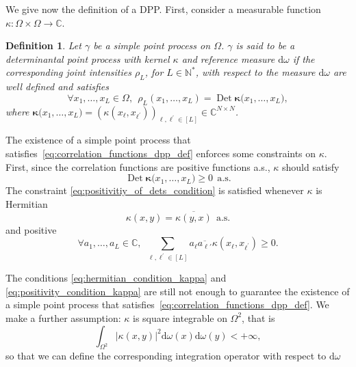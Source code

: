 \documentclass[twoside,11pt]{book}
\newtheorem{definition}{Definition}
\numberwithin{theorem}{chapter}
\numberwithin{definition}{chapter}
\numberwithin{proposition}{chapter}
\numberwithin{corollary}{chapter}
\numberwithin{example}{chapter}
\numberwithin{lemma}{chapter}
\DeclareMathOperator{\Det}{Det}
\begin{document}
We give now the definition of a DPP. First, consider a measurable function $\kappa: \Omega \times \Omega \rightarrow \mathbb{C}$.
\begin{definition}
Let $\gamma$ be a simple point process on $\Omega$. $\gamma$ is said to be a determinantal point process with kernel $\kappa$ and reference measure $\mathrm{d}\omega$ if the corresponding joint intensities $\rho_L$, for $L \in \mathbb{N}^{*}$, with respect to the measure $\mathrm{d}\omega$ are well defined and satisfies
\begin{equation}\label{eq:correlation_functions_dpp_def}
\forall x_{1}, \dots, x_{L} \in \Omega, \:\: \rho_{L}(x_{1}, \dots, x_{L}) = \Det \bm{\kappa}\big( x_{1}, \dots, x_{L} \big),
\end{equation}
where $\bm{\kappa}\big( x_{1}, \dots, x_{L} \big) = (\kappa(x_{\ell},x_{\ell^{'}}))_{\ell,\ell^{'} \in [L]} \in \mathbb{C}^{N \times N}$.

\end{definition}

The existence of a simple point process that satisfies~\eqref{eq:correlation_functions_dpp_def} enforces some constraints on $\kappa$. First, since the correlation functions are positive functions a.s., $\kappa$ should satisfy 
\begin{equation}\label{eq:positivitiy_of_dets_condition}
\Det \bm{\kappa}\big(x_{1}, \dots, x_{L} \big) \geq 0 \:\: \text{a.s.} 
\end{equation}
The constraint \eqref{eq:positivitiy_of_dets_condition} is satisfied whenever $\kappa$ is Hermitian
\begin{equation} \label{eq:hermitian_condition_kappa}
\kappa(x,y) = \overline{\kappa(y,x)} \:\: \text{a.s.}  
\end{equation}
and positive
\begin{equation}\label{eq:positivity_condition_kappa}
\forall a_{1}, \dots, a_{L} \in \mathbb{C}, \:\: \sum\limits_{\ell,\ell^{'} \in [L]} a_{\ell}\overline{a_{\ell'}} \kappa(x_{\ell},x_{\ell^{'}}) \geq 0.
\end{equation} 



The conditions \eqref{eq:hermitian_condition_kappa} and \eqref{eq:positivity_condition_kappa} are still not enough to guarantee the existence of a simple point process that satisfies~\eqref{eq:correlation_functions_dpp_def}. 
 We make a further assumption: $\kappa$ is square integrable on $\Omega^{2}$, that is 
\begin{equation}\label{eq:integrability_condition_kappa}
\int_{\Omega^{2}} |\kappa(x,y)|^{2} \mathrm{d}\omega(x) \mathrm{d}\omega(y) < +\infty,
\end{equation}
so that we can define the corresponding integration operator with respect to $\mathrm{d}\omega$
\end{document}
